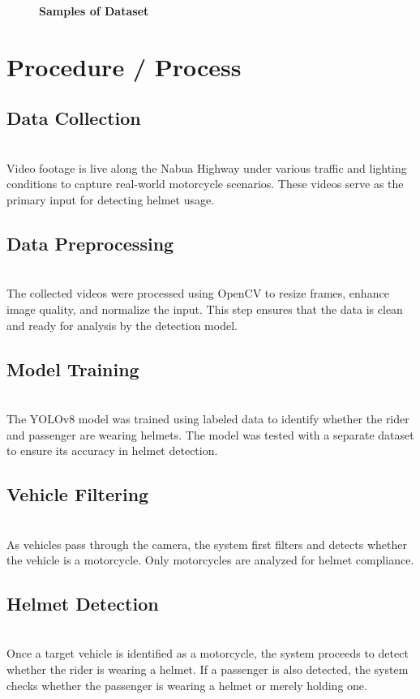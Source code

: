 \begin{refsection}
\begin{figure}[H]
    \caption{\textbf{Samples of Dataset}}
    \label{fig:dataset_samples}
\end{figure}


\section*{Procedure / Process}

    \subsection{Data Collection} \\
    Video footage is live along the Nabua Highway under various traffic and lighting conditions to capture real-world motorcycle scenarios. These videos serve as the primary input for detecting helmet usage.

    \subsection {Data Preprocessing} \\
    The collected videos were processed using OpenCV to resize frames, enhance image quality, and normalize the input. This step ensures that the data is clean and ready for analysis by the detection model.

    \subsection {Model Training} \\
    The YOLOv8 model was trained using labeled data to identify whether the rider and passenger are wearing helmets. The model was tested with a separate dataset to ensure its accuracy in helmet detection.

    \subsection {Vehicle Filtering} \\
    As vehicles pass through the camera, the system first filters and detects whether the vehicle is a motorcycle. Only motorcycles are analyzed for helmet compliance.

    \subsection {Helmet Detection} \\
    Once a target vehicle is identified as a motorcycle, the system proceeds to detect whether the rider is wearing a helmet. If a passenger is also detected, the system checks whether the passenger is wearing a helmet or merely holding one.


\end{refsection}
